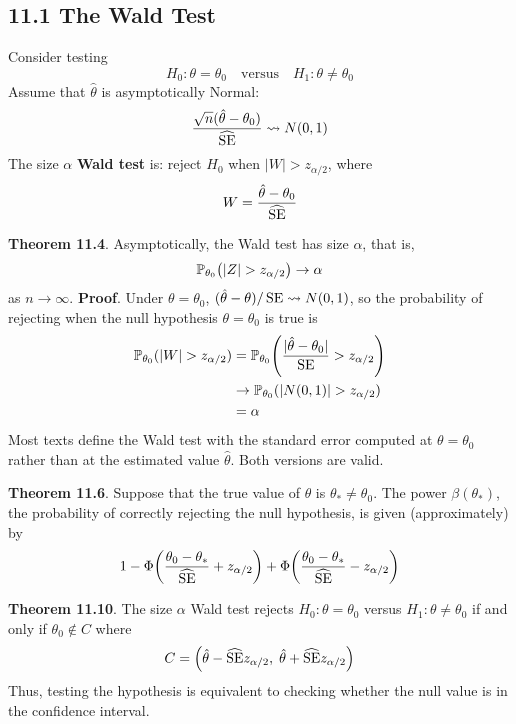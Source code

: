 \subsection*{11.1 The Wald Test}\label{the-wald-test}
Consider testing
\[
H_{0}: \theta = \theta_{0}
\quad \text{versus} \quad
H_{1}: \theta \neq \theta_{0}
\]
Assume that \(\hat{\theta}\) is asymptotically Normal:
\[
\frac{\sqrt{n}(\hat{\theta} - \theta_{0})}{\widehat{\operatorname{\mathrm{SE}}}} \leadsto N(0, 1)
\]
The size \(\alpha\) \textbf{Wald test} is: reject \(H_{0}\) when
\(|W| > z_{\alpha/2}\), where
\[
W = \frac{\hat{\theta} - \theta_{0}}{\widehat{\operatorname{\mathrm{SE}}}}
\]

\textbf{Theorem 11.4}. Asymptotically, the Wald test has size
\(\alpha\), that is,
\[
\PROB_{\theta_{0}} \left(|Z| > z_{\alpha/2} \right) \rightarrow \alpha
\]
as \(n \rightarrow \infty\).
\textbf{Proof}. Under \(\theta = \theta_{0}\),
\((\hat{\theta} - \theta) / \operatorname{\mathrm{SE}} \leadsto N(0, 1)\), so the
probability of rejecting when the null hypothesis \(\theta = \theta_{0}\)
is true is
\begin{align*}
\PROB_{\theta_{0}}(|W| > z_{\alpha / 2}) &= \PROB_{\theta_{0}} \left(\frac{|\hat{\theta} - \theta_{0}|}{\SE } > z_{\alpha/2} \right) \\
& \rightarrow \PROB_{\theta_{0}}(| N(0, 1) | > z_{\alpha/2}) \\
& = \alpha
\end{align*}
Most texts define the Wald test with the standard error computed at
\(\theta = \theta_{0}\) rather than at the estimated value
\(\hat{\theta}\). Both versions are valid.

\textbf{Theorem 11.6}. Suppose that the true value of \(\theta\) is
\(\theta_{*} \neq \theta_{0}\). The power \(\beta(\theta_{*})\), the
probability of correctly rejecting the null hypothesis, is given
(approximately) by
\[
1 - \Phi \left(\frac{\theta_{0} - \theta_{*}}{\widehat{\SE}} + z_{\alpha/2} \right) + \Phi \left(\frac{\theta_{0} - \theta_{*}}{\widehat{\SE}} - z_{\alpha/2} \right)
\]

\textbf{Theorem 11.10}. The size \(\alpha\) Wald test rejects
\(H_{0}: \theta = \theta_{0}\) versus \(H_{1}: \theta \neq \theta_{0}\) if and
only if \(\theta_{0} \notin C\) where
\[
C = \left(\hat{\theta} - \widehat{\SE} z_{\alpha/2}, \; \hat{\theta} + \widehat{\SE} z_{\alpha / 2} \right)
\]
Thus, testing the hypothesis is equivalent to checking whether the null
value is in the confidence interval.

